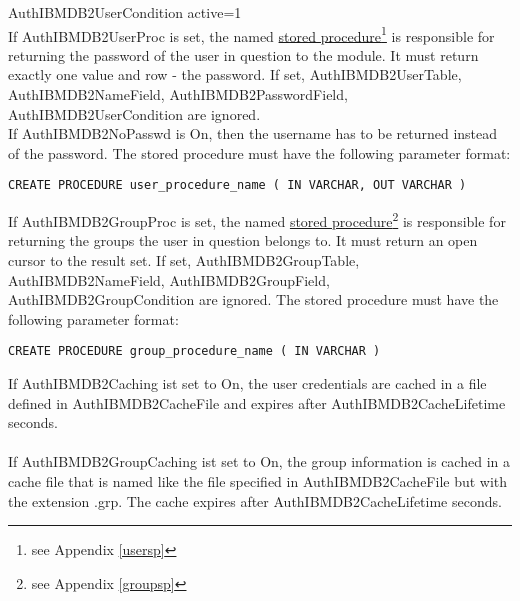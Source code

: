 \documentclass[11pt,letterpaper]{scrartcl}
\def\tt{\normalfont\ttfamily}
\begin{document}
{\tt AuthIBMDB2UserCondition active=1}\\
\newpage
\noindent
If {\tt AuthIBMDB2UserProc} is set, the named \hyperlink{husersp}{stored procedure}\footnote{see Appendix \ref{usersp}} is responsible for returning the password of the user in question to the module. It must return exactly one value and row - the password. If set, {\tt AuthIBMDB2UserTable}, {\tt AuthIBMDB2NameField}, {\tt AuthIBMDB2PasswordField}, {\tt AuthIBMDB2UserCondition} are ignored.\\If {\tt AuthIBMDB2NoPasswd} is {\tt On}, then the username has to be returned instead of the password. The stored procedure must have the following parameter format:
\begin{verbatim}
CREATE PROCEDURE user_procedure_name ( IN VARCHAR, OUT VARCHAR )
\end{verbatim}
If {\tt AuthIBMDB2GroupProc} is set, the named \hyperlink{hgroupsp}{stored procedure}\footnote{see Appendix \ref{groupsp}} is responsible for returning the groups the user in question belongs to. It must return an open cursor to the result set. If set, {\tt AuthIBMDB2GroupTable}, {\tt AuthIBMDB2NameField}, {\tt AuthIBMDB2GroupField}, {\tt AuthIBMDB2GroupCondition} are ignored. The stored procedure must have the following parameter format:
\begin{verbatim}
CREATE PROCEDURE group_procedure_name ( IN VARCHAR )
\end{verbatim}
If {\tt AuthIBMDB2Caching} ist set to {\tt On}, the user credentials are cached in a file defined in {\tt AuthIBMDB2CacheFile} and expires after {\tt AuthIBMDB2CacheLifetime} seconds.\\
\\
If {\tt AuthIBMDB2GroupCaching} ist set to {\tt On}, the group information is cached in a cache file that is named like the file specified in {\tt AuthIBMDB2CacheFile} but with the extension {\tt .grp}. The cache expires after {\tt AuthIBMDB2CacheLifetime} seconds.
\newpage
\end{document}
